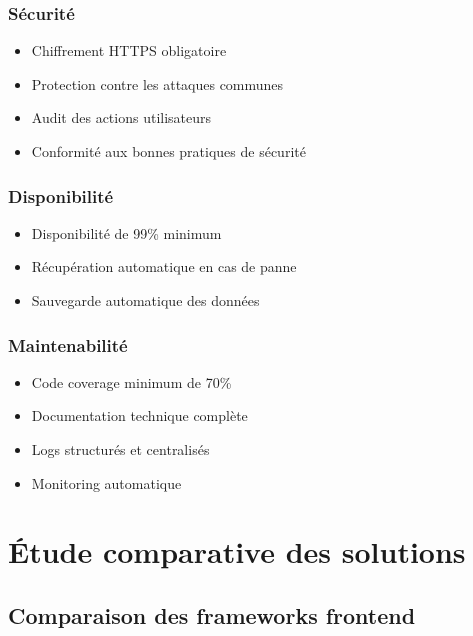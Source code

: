 \subsubsection{Sécurité}
\begin{itemize}
    \item Chiffrement HTTPS obligatoire
    \item Protection contre les attaques communes
    \item Audit des actions utilisateurs
    \item Conformité aux bonnes pratiques de sécurité
\end{itemize}

\subsubsection{Disponibilité}
\begin{itemize}
    \item Disponibilité de 99\% minimum
    \item Récupération automatique en cas de panne
    \item Sauvegarde automatique des données
\end{itemize}

\subsubsection{Maintenabilité}
\begin{itemize}
    \item Code coverage minimum de 70\%
    \item Documentation technique complète
    \item Logs structurés et centralisés
    \item Monitoring automatique
\end{itemize}

\section{Étude comparative des solutions}

\subsection{Comparaison des frameworks frontend}

